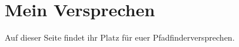 \section*{Mein Versprechen}
Auf dieser Seite findet ihr Platz für euer Pfadfinderversprechen.

\vspace{2cm}
\vfill
\newpage